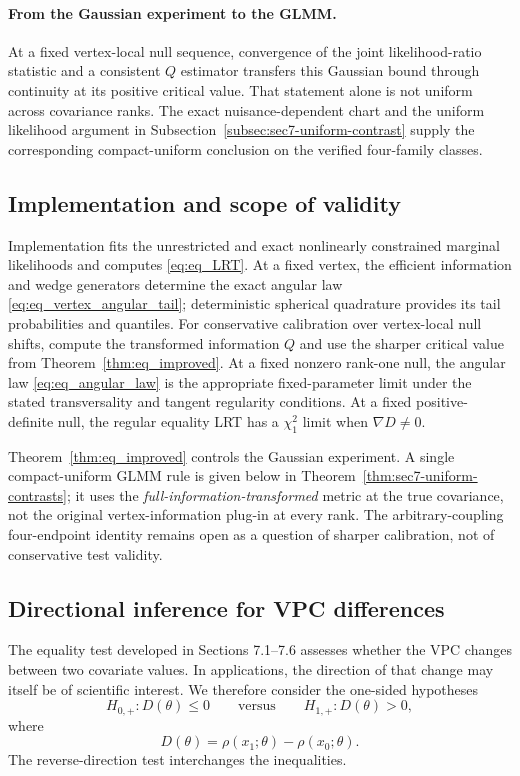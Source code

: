 \paragraph{From the Gaussian experiment to the GLMM.}
At a fixed vertex-local null sequence, convergence of the joint
likelihood-ratio statistic and a consistent $Q$ estimator transfers
this Gaussian bound through continuity at its positive critical value.
That statement alone is not uniform across covariance ranks. The
exact nuisance-dependent chart and the uniform likelihood argument in
Subsection~\ref{subsec:sec7-uniform-contrast} supply the corresponding
compact-uniform conclusion on the verified four-family classes.

\subsection{Implementation and scope of validity}
\label{subsec:eq_implementation}
Implementation fits the unrestricted and exact nonlinearly
constrained marginal likelihoods and computes
\eqref{eq:eq_LRT}. At a fixed vertex, the efficient information
and wedge generators determine the exact angular law
\eqref{eq:eq_vertex_angular_tail}; deterministic spherical
quadrature provides its tail probabilities and quantiles.
For conservative calibration over vertex-local null shifts,
compute the transformed information $Q$ and use the sharper
critical value from Theorem~\ref{thm:eq_improved}.
At a fixed nonzero rank-one null, the angular law
\eqref{eq:eq_angular_law} is the appropriate fixed-parameter
limit under the stated transversality and tangent regularity
conditions. At a fixed positive-definite null, the regular
equality LRT has a $\chi_1^2$ limit when $\nabla D\ne0$.

Theorem~\ref{thm:eq_improved} controls the Gaussian experiment.
A single compact-uniform GLMM rule is given below in
Theorem~\ref{thm:sec7-uniform-contrasts}; it uses the
\emph{full-information-transformed} metric at the true covariance,
not the original vertex-information plug-in at every rank.
The arbitrary-coupling four-endpoint identity remains open as a
question of sharper calibration, not of conservative test validity.


\subsection{Directional inference for VPC differences}
\label{sec:directional-vpc-difference}

The equality test developed in Sections 7.1--7.6 assesses
whether the VPC changes between two covariate values.
In applications, the direction of that change may itself be
of scientific interest. We therefore consider the one-sided
hypotheses
\begin{equation}
H_{0,+}:D(\theta)\leq 0
\qquad\text{versus}\qquad
H_{1,+}:D(\theta)>0,
\label{eq:directional-hypotheses}
\end{equation}
where
\begin{equation*}
D(\theta)
=
\rho(x_1;\theta)-\rho(x_0;\theta).
\end{equation*}
The reverse-direction test interchanges the inequalities.

